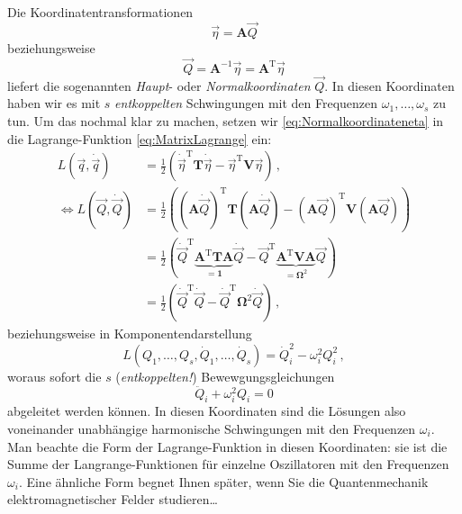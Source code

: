 \documentclass[paper=a4, fontsize=11.0pt, abstractoff, DIV12]{scrartcl}
\begin{document}
Die Koordinatentransformationen
\begin{equation}
\vec \eta = \mathbf{A}\vec{Q}
\label{eq:Normalkoordinateneta}
\end{equation}
beziehungsweise
\begin{equation}
\vec Q = \mathbf{A}^{-1}\vec \eta = \mathbf{A}^{\mathrm{T}}\vec \eta
\label{eq:Normalkoordinaten}
\end{equation}
liefert die sogenannten \emph{Haupt}- oder \emph{Normalkoordinaten} $\vec{Q}$.
In diesen Koordinaten haben wir es mit $s$ \emph{entkoppelten}
Schwingungen mit den Frequenzen $\omega_1, \dots, \omega_s$ zu tun. Um das
nochmal klar zu machen, setzen wir \eqref{eq:Normalkoordinateneta} in die
Lagrange-Funktion \eqref{eq:MatrixLagrange} ein:
\begin{align}
L(\vec q, \dot{\vec q}) &= \frac{1}{2}\left(\dot{\vec{\eta}}^\mathrm{T}\mathbf{T}\dot{\vec{\eta}} - \vec{\eta}^\mathrm{T}\mathbf{V}\vec{\eta}\right)\,,\nonumber\\
\Leftrightarrow L(\vec Q, \dot{\vec Q}) &= \frac{1}{2}\left( (\mathbf{A}\dot{\vec Q})^\mathrm{T}\mathbf{T}(\mathbf{A}\dot{\vec Q}) - (\mathbf{A}{\vec Q})^\mathrm{T}\mathbf{V}(\mathbf{A}{\vec Q}) \right) \nonumber\\
&= \frac{1}{2}\left(\dot{\vec{Q}}^\mathrm{T}\underbrace{\mathbf{A}^\mathrm{T}\mathbf{T}\mathbf{A}}_{=\mathbf{1}}\dot{\vec{Q}} - \vec{Q}^\mathrm{T}\underbrace{\mathbf{A}^\mathrm{T}\mathbf{V}\mathbf{A}}_{=\mathbf{\Omega}^2}\vec{Q}\right)\nonumber\\
&= \frac{1}{2}\left(\dot{\vec{Q}}^\mathrm{T}\dot{\vec Q} - \dot{\vec{Q}}^\mathrm{T}\mathbf{\Omega}^2\dot{\vec Q}\right)\,,
\end{align}
beziehungsweise in Komponentendarstellung
\begin{equation}
L(Q_1,\dots,Q_s, \dot{Q}_1,\dots,\dot{Q}_s) = \dot{Q}_i^2 - \omega_i^2 Q_i^2\, ,
\end{equation}
woraus sofort die $s$ (\emph{entkoppelten!}) Bewewgungsgleichungen
\begin{equation}
\ddot{Q}_i + \omega_i^2 Q_i = 0
\end{equation}
abgeleitet werden können. In diesen Koordinaten sind die Lösungen also
voneinander unabhängige harmonische Schwingungen mit den Frequenzen
$\omega_i$. Man beachte die Form der Lagrange-Funktion in diesen Koordinaten:
sie ist die Summe der Langrange-Funktionen für einzelne Oszillatoren mit
den Frequenzen $\omega_i$. Eine ähnliche Form begnet Ihnen später, wenn Sie die
Quantenmechanik elektromagnetischer Felder studieren\dots
\end{document}
